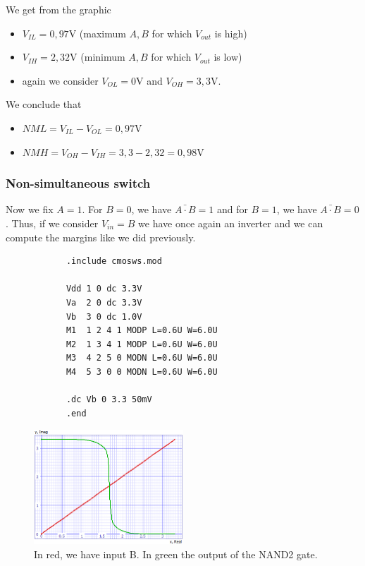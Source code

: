 \documentclass[../main.tex]{subfiles}
\begin{document}
{{		We get from the graphic
		
		\begin{itemize}
			\item $V_{IL} = 0,97$V (maximum $A,B$ for which $V_{out}$ is high)
			\item $V_{IH} = 2,32$V (minimum $A,B$ for which $V_{out}$ is low)
			\item again we consider $V_{OL} = 0$V and $V_{OH} = 3,3$V.
		\end{itemize}
		
		We conclude that
		\begin{itemize}
			\item $NML = V_{IL} - V_{OL} = 0,97$V
			\item $NMH = V_{OH} - V_{IH} = 3,3 - 2,32 = 0,98$V
		\end{itemize}
	}
	
	\subsubsection{Non-simultaneous switch}
	{
		Now we fix $A = 1$. For $B=0$, we have $\bar{A \cdot B} = 1$ and for $B = 1$, we have $\bar{A \cdot B} = 0$. Thus, if we consider $V_{in} = B$ we have once again an inverter and we can compute the margins like we did previously.
		
		\begin{lstlisting}
			.include cmosws.mod
			
			Vdd 1 0 dc 3.3V
			Va  2 0 dc 3.3V
			Vb  3 0 dc 1.0V
			M1  1 2 4 1 MODP L=0.6U W=6.0U
			M2  1 3 4 1 MODP L=0.6U W=6.0U
			M3  4 2 5 0 MODN L=0.6U W=6.0U
			M4  5 3 0 0 MODN L=0.6U W=6.0U
			
			.dc Vb 0 3.3 50mV
			.end
		\end{lstlisting}
		
		\begin{figure}[H]
			\centering
			\includegraphics[width=0.5\textwidth]{plots/Q5_1.png}
			\caption{In red, we have input B. In green the output of the NAND2 gate.}
		\end{figure}
		
}}
\end{document}

